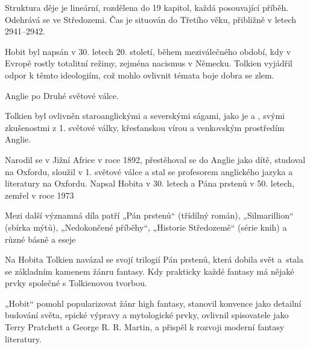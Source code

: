 \documentclass[FGBook.tex]{subfiles}
\begin{document}
\noindent Struktura děje je lineární, rozdělena do 19 kapitol, každá posouvající příběh.
Odehrává se ve Středozemi.
Čas je situován do Třetího věku, přibližně v letech 2941–2942.



\noindent Hobit byl napsán v 30. letech 20. století,
během meziválečného období, kdy v Evropě rostly totalitní režimy, zejména nacismus v Německu.
Tolkien vyjádřil odpor k těmto ideologiím, což mohlo ovlivnit témata boje dobra se zlem.

\noindent Anglie po Druhé světové válce.


\noindent Tolkien byl ovlivněn staroanglickými a severskými ságami,
jako je  a ,
svými zkušenostmi z 1. světové války,
křesťanskou vírou a venkovským prostředím Anglie.

\noindent Narodil se v Jižní Africe v roce 1892,
přestěhoval se do Anglie jako dítě, studoval na Oxfordu,
sloužil v 1. světové válce a stal se profesorem anglického jazyka a literatury na Oxfordu.
Napsal Hobita v 30. letech a Pána prstenů v 50. letech, zemřel v roce 1973


\noindent 
Mezi další významná díla patří „Pán prstenů“ (třídílný román), „Silmarillion“ (sbírka mýtů),
„Nedokončené příběhy“, „Historie Středozemě“ (série knih) a různé básně a eseje

\noindent Na Hobita Tolkien navázal se svojí trilogií Pán prstenů, která dobila svět
a~stala se základním kamenem žánru fantasy.
Kdy prakticky každé fantasy má nějaké prvky společné s Tolkienovou tvorbou.

„Hobit“ pomohl popularizovat žánr high fantasy,
stanovil konvence jako detailní budování světa, epické výpravy a mytologické prvky,
ovlivnil spisovatele jako Terry Pratchett a George R. R. Martin,
a přispěl k rozvoji moderní fantasy literatury.

\end{document}
